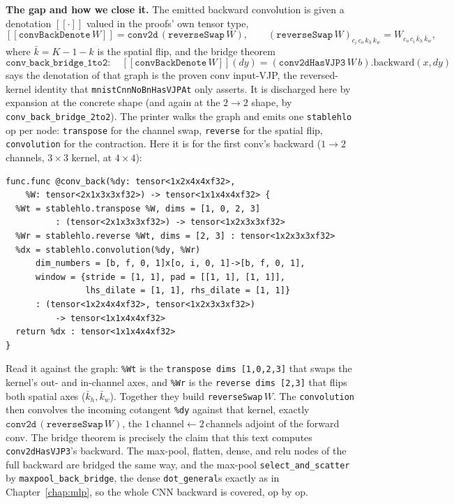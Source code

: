 \medskip\noindent\textbf{The gap and how we close it.} The emitted
backward convolution is given a denotation $[\![\cdot]\!]$ valued in the
proofs' own tensor type,
\[
  [\![\texttt{convBackDenote}\,W]\!]
  = \texttt{conv2d}\,(\texttt{reverseSwap}\,W),
  \qquad
  (\texttt{reverseSwap}\,W)_{c_i\,c_o\,k_h\,k_w} = W_{c_o\,c_i\,\bar k_h\,\bar k_w},
\]
where $\bar k = K - 1 - k$ is the spatial flip, and the bridge theorem
\[
  \texttt{conv\_back\_bridge\_1to2}:\quad
  [\![\texttt{convBackDenote}\,W]\!](dy)
  = (\texttt{conv2dHasVJP3}\,W\,b).\mathrm{backward}(x, dy)
\]
says the denotation of that graph is the proven conv input-VJP, the
reversed-kernel identity that \texttt{mnistCnnNoBnHasVJPAt} only asserts.
It is discharged here by expansion at the concrete shape (and again at the
$2{\to}2$ shape, by \texttt{conv\_back\_bridge\_2to2}). The printer walks the
graph and emits one \texttt{stablehlo} op per node: \texttt{transpose}
for the channel swap, \texttt{reverse} for the spatial flip,
\texttt{convolution} for the contraction. Here it is for the first
conv's backward ($1{\to}2$ channels, $3\times3$ kernel, at $4\times4$):

\begin{verbatim}
func.func @conv_back(%dy: tensor<1x2x4x4xf32>,
    %W: tensor<2x1x3x3xf32>) -> tensor<1x1x4x4xf32> {
  %Wt = stablehlo.transpose %W, dims = [1, 0, 2, 3]
          : (tensor<2x1x3x3xf32>) -> tensor<1x2x3x3xf32>
  %Wr = stablehlo.reverse %Wt, dims = [2, 3] : tensor<1x2x3x3xf32>
  %dx = stablehlo.convolution(%dy, %Wr)
      dim_numbers = [b, f, 0, 1]x[o, i, 0, 1]->[b, f, 0, 1],
      window = {stride = [1, 1], pad = [[1, 1], [1, 1]],
                lhs_dilate = [1, 1], rhs_dilate = [1, 1]}
      : (tensor<1x2x4x4xf32>, tensor<1x2x3x3xf32>)
          -> tensor<1x1x4x4xf32>
  return %dx : tensor<1x1x4x4xf32>
}
\end{verbatim}

\noindent Read it against the graph: \texttt{\%Wt} is the
\texttt{transpose dims [1,0,2,3]} that swaps the kernel's out- and
in-channel axes, and \texttt{\%Wr} is the \texttt{reverse dims [2,3]} that
flips both spatial axes ($\bar k_h,\bar k_w$). Together they build
\texttt{reverseSwap}\,$W$. The \texttt{convolution} then convolves the
incoming cotangent \texttt{\%dy} against that kernel, exactly
$\texttt{conv2d}\,(\texttt{reverseSwap}\,W)$, the
$1\,\text{channel} \leftarrow 2\,\text{channels}$ adjoint of the forward
conv. The bridge theorem is precisely the claim that this text computes
\texttt{conv2dHasVJP3}'s backward. The max-pool, flatten, dense, and
relu nodes of the full backward are bridged the same way, and the max-pool
\texttt{select\_and\_scatter} by \texttt{maxpool\_back\_bridge}, the dense
\texttt{dot\_general}s exactly as in Chapter~\ref{chap:mlp}, so the
whole CNN backward is covered, op by op.

